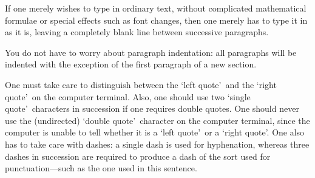 If one merely wishes to type in ordinary text, without
complicated mathematical formulae or special effects such
as font changes, then one merely has to type it in as it
is, leaving a completely blank line between successive
paragraphs.

You do not have to worry about paragraph indentation:
all paragraphs will be indented with the exception of
the first paragraph of a new section.

One must take care to distinguish between the \lq left quote\rq\
 and the \lq right quote\rq\ on the computer terminal. Also, one
should use two \lq single quote\rq\ characters in succession if
one requires double quotes. One should never use the
(undirected) \lq double quote\rq\ character on the computer
terminal, since the computer is unable to tell whether it
is a \lq left quote\rq\ or a \lq right quote\rq. One also has to
take care with dashes: a single dash is used for
hyphenation, whereas three dashes in succession are required
to produce a dash of the sort used for punctuation---such as
the one used in this sentence.


\bye
